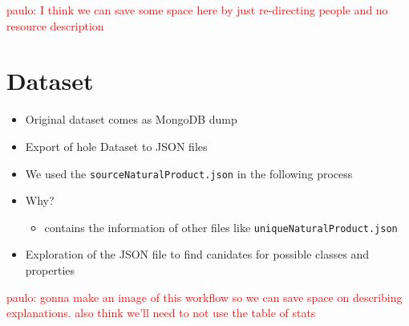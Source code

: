 \documentclass[
]{ceurart}
\begin{document}
\textcolor{red}{paulo: I think we can save some space here by just re-directing people and no resource description}

\begin{table}[h]
    \centering
    \caption{Resources described in this paper.}
    \label{tab:resources}
\end{table}

\section{Dataset}
\begin{itemize}
    \item Original dataset comes as MongoDB dump
    \item Export of hole Dataset to JSON files
    \item We used the \texttt{sourceNaturalProduct.json} in the following process
    \item Why?
    \begin{itemize}
        \item contains the information of other files like \texttt{uniqueNaturalProduct.json}
    \end{itemize}
    \item Exploration of the JSON file to find canidates for possible classes and properties
\end{itemize}

\textcolor{red}{paulo: gonna make an image of this workflow so we can save space on describing explanations. also think we'll need to not use the table of stats}
\end{document}

